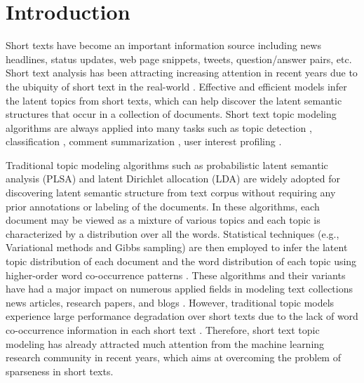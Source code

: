 \documentclass[10pt,journal,compsoc]{IEEEtran}
\begin{document}
\maketitle


\IEEEdisplaynontitleabstractindextext

\IEEEpeerreviewmaketitle




\section{Introduction}

Short texts have become an important information source including news headlines, status updates, web page snippets, tweets, question/answer pairs, etc.  Short text analysis has been attracting increasing attention in recent years due to the ubiquity of short text in the real-world \cite{Lin2014The,qiang2016topic,shi2018short}. Effective and efficient models infer the latent topics from short texts, which can help discover the latent semantic structures that occur in a collection of documents. Short text topic modeling algorithms are always applied into many tasks such as topic detection \cite{wang2007mining}, classification \cite{sriram2010short}, comment summarization \cite{ma2012topic}, user interest profiling \cite{weng2010twitterrank}.

Traditional topic modeling algorithms such as probabilistic latent semantic analysis (PLSA) \cite{hofmann1999probabilistic} and latent Dirichlet allocation (LDA) \cite{blei2003latent} are widely adopted for discovering latent semantic structure from text corpus without requiring any prior annotations or labeling of the documents. In these algorithms, each document may be viewed as a mixture of various topics and each topic is characterized by a distribution over all the words. Statistical techniques (e.g., Variational methods and Gibbs sampling) are then employed to infer the latent topic distribution of each document and the word distribution of each topic using higher-order word co-occurrence patterns \cite{blei2012probabilistic}. These algorithms and their variants have had a major impact on numerous applied fields in modeling text collections news articles, research papers, and blogs \cite{Hoffman2010Online,xie2013integrating,xie2015incorporating}. However, traditional topic models experience large performance degradation over short texts due to the lack of word co-occurrence information in each short text \cite{cheng2014btm, Lin2014The}. Therefore, short text topic modeling has already attracted much attention from the machine learning research community in recent years, which aims at overcoming the problem of sparseness in short texts.
\end{document}
